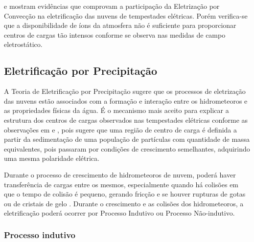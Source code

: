  e  mostram evidências que comprovam a participação da Eletrização por Convecção na eletrificação das nuvens de tempestades elétricas. Porém verifica-se que a disponibilidade de íons da atmosfera não é suficiente para proporcionar centros de cargas tão intensos conforme se observa nas medidas de campo eletrostático. 

\subsection{Eletrificação por Precipitação}

A Teoria de Eletrificação por Precipitação sugere que os processos de eletrização das nuvens estão associados com a formação e interação entre os hidrometeoros e as propriedades físicas da água. É o mecanismo mais aceito para explicar a estrutura dos centros de cargas observados nas tempestades elétricas conforme as observações em  e , pois sugere que uma região de centro de carga é definida a partir da sedimentação de uma população de partículas com quantidade de massa equivalentes, pois passaram por condições de crescimento semelhantes, adquirindo uma mesma polaridade elétrica. 



Durante o processo de crescimento de hidrometeoros de nuvem, poderá haver transferência de cargas entre os mesmos, especialmente quando há colisões em que o tempo de colisão é pequeno, gerando fricção e se houver rupturas de gotas ou de cristais de gelo \cite{Lenard1892, reynolds1957, matthews1964, jonas1968, simpson1909}. Durante o crescimento e as colisões dos hidrometeoros, a eletrificação poderá ocorrer por Processo Indutivo ou Processo Não-indutivo.


\subsubsection{Processo indutivo} 

